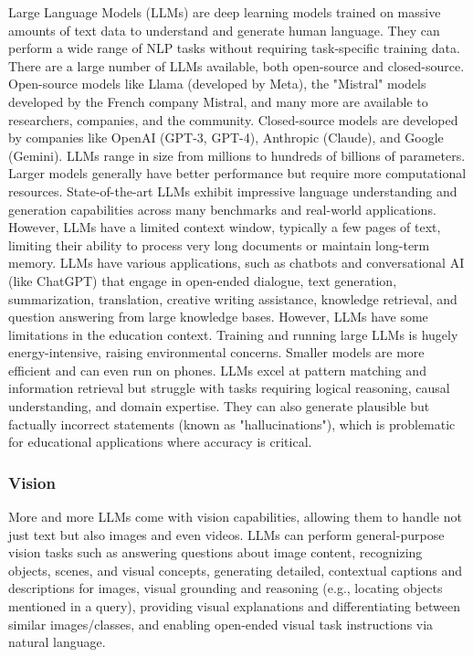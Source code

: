 \documentclass{article}
\begin{document}
Large Language Models (LLMs) are deep learning models trained on massive
amounts of text data to understand and generate human language. They can
perform a wide range of NLP tasks without requiring task-specific training data.
There are a large number of LLMs available, both open-source and closed-source.
Open-source models like Llama (developed by Meta), the "Mistral" models
developed by the French company Mistral, and many more are available to
researchers, companies, and the community. Closed-source models are
developed by companies like OpenAI (GPT-3, GPT-4), Anthropic (Claude),
and Google (Gemini).
LLMs range in size from millions to hundreds of billions of parameters.
Larger models generally have better performance but require more computational
resources. State-of-the-art LLMs exhibit impressive language understanding
and generation capabilities across many benchmarks and real-world
applications. However, LLMs have a limited context window, typically
a few pages of text, limiting their ability to process very long documents
or maintain long-term memory.
LLMs have various applications, such as chatbots and conversational AI
(like ChatGPT) that engage in open-ended dialogue, text generation,
summarization, translation, creative writing assistance, knowledge
retrieval, and question answering from large knowledge bases.
However, LLMs have some limitations in the education context. Training
and running large LLMs is hugely energy-intensive, raising environmental
concerns. Smaller models are more efficient and can even run on phones.
LLMs excel at pattern matching and information retrieval but struggle
with tasks requiring logical reasoning, causal understanding, and domain
expertise. They can also generate plausible but factually incorrect
statements (known as "hallucinations"), which is problematic for
educational applications where accuracy is critical.

\subsubsection{Vision}

More and more LLMs come with vision capabilities, allowing them to handle not just text but also images and even videos. LLMs can perform general-purpose vision tasks such as answering questions about image content, recognizing objects, scenes, and visual concepts, generating detailed, contextual captions and descriptions for images, visual grounding and reasoning (e.g., locating objects mentioned in a query), providing visual explanations and differentiating between similar images/classes, and enabling open-ended visual task instructions via natural language.
\end{document}
